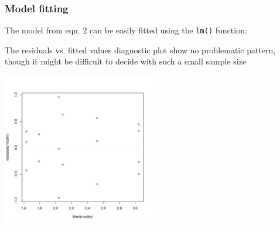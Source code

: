 \subsubsection{Model fitting}
The model from eqn. 2 can be easily fitted using the \texttt{lm()} function:

\begin{knitrout}
\color{fgcolor}\begin{kframe}
\begin{alltt}
 \hlkwb{<-}  \hlopt{~}   
\end{alltt}
\end{kframe}
\end{knitrout}

The residuals vs. fitted values diagnostic plot show no problematic pattern, though it might be difficult to decide with such a small sample size
\begin{knitrout}
\color{fgcolor}\begin{kframe}
\begin{alltt}
\hlstd{(} \hlopt{~} 
\hlstd{(} \hlstd{=} \hlstd{,}  \hlstd{=} \hlstd{)}
\end{alltt}
\end{kframe}

{\centering \includegraphics[width=0.5\textwidth]{appendix/usetheglm/two/plot_modlm-1} 

}



\end{knitrout}

